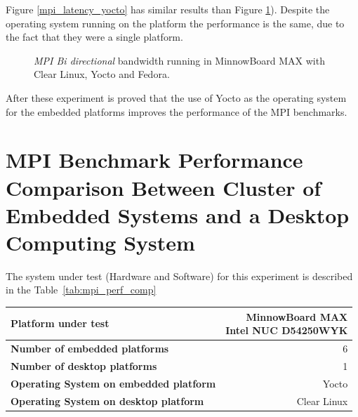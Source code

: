 Figure \ref{mpi_latency_yocto} has similar results than Figure
\ref{mpi_roundtrip_yocto}). Despite the operating system running on the platform
the performance is the same, due to the fact that they were a single platform.


\begin{figure}[H]
\begin{center}
\end{center}
\caption{\textit{MPI Bi directional} bandwidth running in  MinnowBoard MAX  with Clear Linux,
Yocto and Fedora.}
\label{mpi_roundtrip_yocto}
\end{figure}

After these experiment is proved that the use of Yocto as the operating system
for the embedded platforms improves the performance of the MPI benchmarks. 

\section{MPI Benchmark Performance Comparison Between Cluster of Embedded
Systems and a Desktop Computing System}

The system under test (Hardware and Software) for this experiment is described
in the Table~\ref{tab:mpi_perf_comp}
    
    \begin{center}
    \begin{tabular}{ | l | r |}
        \hline
        \textbf{Platform under test} & \shortstack{MinnowBoard MAX \\  Intel  NUC D54250WYK } \\ \hline
        \textbf{Number of embedded platforms}  & 6  \\ \hline
        \textbf{Number of desktop platforms}  & 1  \\ \hline
        \textbf{Operating System on embedded platform} & Yocto  \\ \hline
        \textbf{Operating System on desktop platform} & Clear Linux  \\ \hline
    \end{tabular}
    \label{tab:mpi_perf_comp}
    \end{center}

